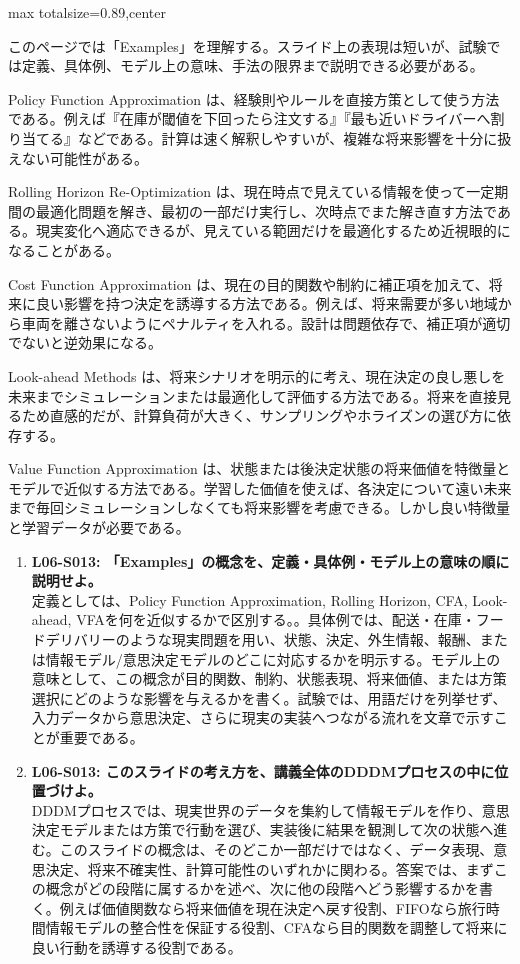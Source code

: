 \begin{minipage}[t]{0.58\textwidth}
\begin{adjustbox}{max totalsize={\textwidth}{0.89\textheight},center}
\begin{minipage}{\textwidth}\scriptsize
{}このページでは「Examples」を理解する。スライド上の表現は短いが、試験では定義、具体例、モデル上の意味、手法の限界まで説明できる必要がある。\par
Policy Function Approximation は、経験則やルールを直接方策として使う方法である。例えば『在庫が閾値を下回ったら注文する』『最も近いドライバーへ割り当てる』などである。計算は速く解釈しやすいが、複雑な将来影響を十分に扱えない可能性がある。\par
Rolling Horizon Re-Optimization は、現在時点で見えている情報を使って一定期間の最適化問題を解き、最初の一部だけ実行し、次時点でまた解き直す方法である。現実変化へ適応できるが、見えている範囲だけを最適化するため近視眼的になることがある。\par
Cost Function Approximation は、現在の目的関数や制約に補正項を加えて、将来に良い影響を持つ決定を誘導する方法である。例えば、将来需要が多い地域から車両を離さないようにペナルティを入れる。設計は問題依存で、補正項が適切でないと逆効果になる。\par
Look-ahead Methods は、将来シナリオを明示的に考え、現在決定の良し悪しを未来までシミュレーションまたは最適化して評価する方法である。将来を直接見るため直感的だが、計算負荷が大きく、サンプリングやホライズンの選び方に依存する。\par
Value Function Approximation は、状態または後決定状態の将来価値を特徴量とモデルで近似する方法である。学習した価値を使えば、各決定について遠い未来まで毎回シミュレーションしなくても将来影響を考慮できる。しかし良い特徴量と学習データが必要である。\par{}\begin{enumerate}\item \textbf{L06-S013: 「Examples」の概念を、定義・具体例・モデル上の意味の順に説明せよ。}\\定義としては、Policy Function Approximation, Rolling Horizon, CFA, Look-ahead, VFAを何を近似するかで区別する。。具体例では、配送・在庫・フードデリバリーのような現実問題を用い、状態、決定、外生情報、報酬、または情報モデル/意思決定モデルのどこに対応するかを明示する。モデル上の意味として、この概念が目的関数、制約、状態表現、将来価値、または方策選択にどのような影響を与えるかを書く。試験では、用語だけを列挙せず、入力データから意思決定、さらに現実の実装へつながる流れを文章で示すことが重要である。\item \textbf{L06-S013: このスライドの考え方を、講義全体のDDDMプロセスの中に位置づけよ。}\\DDDMプロセスでは、現実世界のデータを集約して情報モデルを作り、意思決定モデルまたは方策で行動を選び、実装後に結果を観測して次の状態へ進む。このスライドの概念は、そのどこか一部だけではなく、データ表現、意思決定、将来不確実性、計算可能性のいずれかに関わる。答案では、まずこの概念がどの段階に属するかを述べ、次に他の段階へどう影響するかを書く。例えば価値関数なら将来価値を現在決定へ戻す役割、FIFOなら旅行時間情報モデルの整合性を保証する役割、CFAなら目的関数を調整して将来に良い行動を誘導する役割である。\end{enumerate}

\end{minipage}
\end{adjustbox}
\end{minipage}
